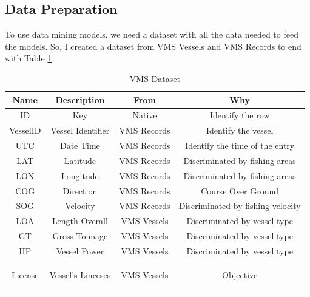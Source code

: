 \subsection{Data Preparation} %
\label{sub:data_preparation}
To use data mining models, we need a dataset with all the data needed to feed the models. So, I created a dataset from VMS Vessels and VMS Records to end with Table \ref{table:vms_dataset}. 

\begin {table}[H]
\begin{center}
\begin{tabular}{c|c|c|c}
\textbf{Name }    & \textbf{Description} & \textbf{From} & \textbf{Why} \\
\hline
ID                & Key              & Native               & Identify the row           \\
VesselID          & Vessel Identifier   & VMS Records                & Identify the vessel  \\
UTC         & Date Time & VMS Records &Identify the time of the entry\\
LAT        & Latitude & VMS Records & Discriminated by fishing areas\\
LON        & Longitude & VMS Records & Discriminated by fishing areas\\
COG        & Direction & VMS Records & Course Over Ground\\
SOG        & Velocity & VMS Records & Discriminated by fishing velocity\\
LOA        & Length Overall & VMS Vessels & Discriminated by vessel type\\
GT        &  Gross Tonnage & VMS Vessels & Discriminated by vessel type\\
HP         &Vessel Power & VMS Vessels & Discriminated by vessel type\\
License        & Vessel's Linceses & VMS Vessels & Objective
           
\label{table:vms_dataset}
\end{tabular}
\caption {VMS Dataset}
\end{center}
\end {table}

